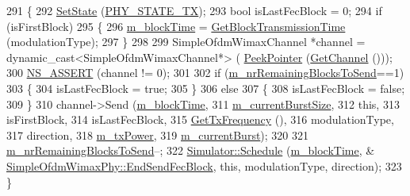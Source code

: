 \begin{DoxyCode}
291 \{
292   \hyperlink{classns3_1_1WimaxPhy_abb3acfe9ecda0e5a44275fdb3e4ccf5c}{SetState} (\hyperlink{classns3_1_1WimaxPhy_a9cc75c9e84f88fc3064bba918eee1f78a1eb92f4a15ce9cecc184038a7204e95c}{PHY\_STATE\_TX});
293   \textcolor{keywordtype}{bool} isLastFecBlock = 0;
294   \textcolor{keywordflow}{if} (isFirstBlock)
295     \{
296       \hyperlink{classns3_1_1SimpleOfdmWimaxPhy_ae87e2a7a2406f824acb988537520b1b7}{m\_blockTime} = \hyperlink{classns3_1_1SimpleOfdmWimaxPhy_a85c175d6f5999f256a6f37a8ecc2fb00}{GetBlockTransmissionTime} (modulationType);
297     \}
298 
299   SimpleOfdmWimaxChannel *channel = \textcolor{keyword}{dynamic\_cast<}SimpleOfdmWimaxChannel*\textcolor{keyword}{>} (
      \hyperlink{namespacens3_af2a7557fe9afdd98d8f6f8f6e412cf5a}{PeekPointer} (\hyperlink{classns3_1_1WimaxPhy_a178bf19461a73be0251443af2204e0ac}{GetChannel} ()));
300   \hyperlink{assert_8h_a6dccdb0de9b252f60088ce281c49d052}{NS\_ASSERT} (channel != 0);
301 
302   \textcolor{keywordflow}{if} (\hyperlink{classns3_1_1SimpleOfdmWimaxPhy_ab620d0d5dfe17d488f58af20e0af6113}{m\_nrRemainingBlocksToSend}==1)
303     \{
304       isLastFecBlock = \textcolor{keyword}{true};
305     \}
306   \textcolor{keywordflow}{else}
307     \{
308       isLastFecBlock = \textcolor{keyword}{false};
309     \}
310   channel->Send (\hyperlink{classns3_1_1SimpleOfdmWimaxPhy_ae87e2a7a2406f824acb988537520b1b7}{m\_blockTime},
311                  \hyperlink{classns3_1_1SimpleOfdmWimaxPhy_ad010bd0c35066302481c613b362809c9}{m\_currentBurstSize},
312                  \textcolor{keyword}{this},
313                  isFirstBlock,
314                  isLastFecBlock,
315                  \hyperlink{classns3_1_1WimaxPhy_a57f8a4af9386d9a0e3192f95a3904283}{GetTxFrequency} (),
316                  modulationType,
317                  direction,
318                  \hyperlink{classns3_1_1SimpleOfdmWimaxPhy_a125a367d9d6b859d95df1fd2d964ed23}{m\_txPower},
319                  \hyperlink{classns3_1_1SimpleOfdmWimaxPhy_a4b9c8b10addab3e49f8a37264ee95b0a}{m\_currentBurst});
320 
321   \hyperlink{classns3_1_1SimpleOfdmWimaxPhy_ab620d0d5dfe17d488f58af20e0af6113}{m\_nrRemainingBlocksToSend}--;
322   \hyperlink{classns3_1_1Simulator_a671882c894a08af4a5e91181bf1eec13}{Simulator::Schedule} (\hyperlink{classns3_1_1SimpleOfdmWimaxPhy_ae87e2a7a2406f824acb988537520b1b7}{m\_blockTime}, &
      \hyperlink{classns3_1_1SimpleOfdmWimaxPhy_a488d6fa3a7f48b641422e790c796a742}{SimpleOfdmWimaxPhy::EndSendFecBlock}, \textcolor{keyword}{this}, modulationType, direction);
323 \}
\end{DoxyCode}


